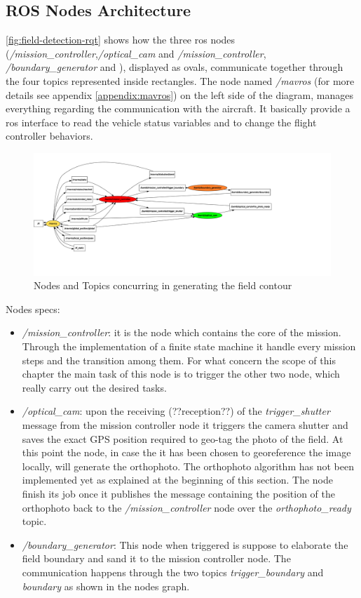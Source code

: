 \subsection{ROS Nodes Architecture} %
\label{sub:ros_nodes}
\autoref{fig:field-detection-rqt} shows how the three \acrshort{ros} nodes (\textit{/mission\_controller},\textit{/optical\_cam} and \textit{/mission\_controller}, \textit{/boundary\_generator} and ), displayed as ovals, communicate together through the four topics represented inside rectangles. The node named \textit{/mavros} (for more details see appendix \ref{appendix:mavros}) on the left side of the diagram, manages everything regarding the communication with the aircraft. It basically provide a \acrshort{ros} interface to read the vehicle status variables and to change the flight controller behaviors.\par
\begin{figure}[ht]
    \centering
    \includegraphics[width=1.3\textwidth]{figures/C2/fieldDetection-rqt_graph.pdf}
    \caption{Nodes and Topics concurring in generating the field contour}
    \label{fig:field-detection-rqt}
\end{figure}
Nodes specs:
\begin{itemize}
	\item \textit{/mission\_controller}: it is the node which contains the core of the mission. Through the implementation of a finite state machine it handle every mission steps and the transition among them. For what concern the scope of this chapter the main task of this node is to trigger the other two node, which really carry out the desired tasks.
	\item \textit{/optical\_cam}: upon the receiving (??reception??) of the \textit{trigger\_shutter} message from the mission controller node it triggers the camera shutter and saves the exact GPS position required to geo-tag the photo of the field.
	At this point the node, in case the it has been chosen to georeference the image locally, will generate the orthophoto. The orthophoto algorithm has not been implemented yet as explained at the beginning of this section.
	The node finish its job once it publishes the message containing the position of the orthophoto back to the \textit{/mission\_controller} node over the \textit{orthophoto\_ready} topic. 
	\item \textit{/boundary\_generator}: This node when triggered is suppose to elaborate the field boundary and sand it to the mission controller node. The communication happens through the two topics \textit{trigger\_boundary} and \textit{boundary} as shown in the nodes graph.
\end{itemize}
